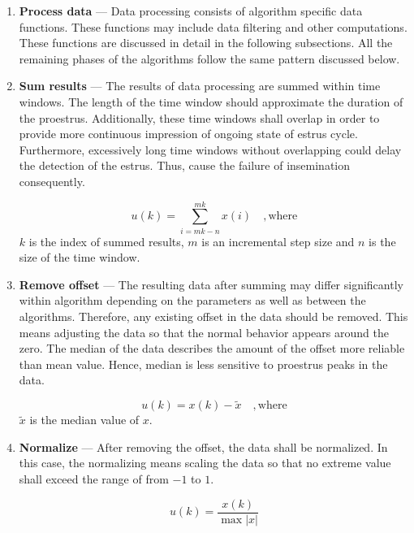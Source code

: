 \documentclass[english,12pt,a4paper,pdftex,elec,utf8]{aaltothesis}
\begin{document}
\begin{enumerate}

\item \textbf{Process data} --- Data processing consists of algorithm specific data functions. These functions may include data filtering and other computations. These functions are discussed in detail in the following subsections. All the remaining phases of the algorithms follow the same pattern discussed below. 

\item \textbf{Sum results} --- The results of data processing are summed within time windows. The length of the time window should approximate the duration of the proestrus. Additionally, these time windows shall overlap in order to provide more continuous impression of ongoing state of estrus cycle. Furthermore, excessively long time windows without overlapping could delay the detection of the estrus. Thus, cause the failure of insemination consequently. 

\begin{equation}
u(k) =\sum\limits^{mk}_{i = mk - n} x(i) \mathrm{\hspace{1em}, where}
\end{equation}
$k$ is the index of summed results, $m$ is an incremental step size and $n$ is the size of the time window.

\item \textbf{Remove offset} --- The resulting data after summing may differ significantly within algorithm depending on the parameters as well as between the algorithms. Therefore, any existing offset in the data should be removed. This means adjusting the data so that the normal behavior appears around the zero. The median of the data describes the amount of the offset more reliable than mean value. Hence, median is less sensitive to proestrus peaks in the data.  

\begin{equation}
u(k) = x(k) - \tilde{x} \mathrm{\hspace{1em}, where}
\end{equation}
$\tilde{x}$ is the median value of $x$.

\item \textbf{Normalize} --- After removing the offset, the data shall be normalized. In this case, the normalizing means scaling the data so that no extreme value shall exceed the range of from $-1$ to $1$.

\begin{equation}
u(k) = \frac{x(k)}{\max  \left| x \right|} 
\end{equation}



\end{enumerate}
\end{document}

